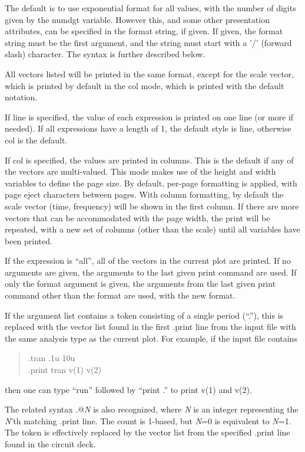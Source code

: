 The default is to use exponential format for all values, with the
number of digits given by the {\et numdgt} variable.  However this,
and some other presentation attributes, can be specified in the format
string, if given.  If given, the format string must be the first
argument, and the string must start with a '/' (forward slash)
character.  The syntax is further described below.

All vectors listed will be printed in the same format, except for the
scale vector, which is printed by default in the {\vt col} mode, which
is printed with the default notation.

If {\vt line} is specified, the value of each expression is printed on
one line (or more if needed).  If all expressions have a length of 1,
the default style is {\vt line}, otherwise {\vt col} is the default.

If {\vt col} is specified, the values are printed in columns.  This is
the default if any of the vectors are multi-valued.  This mode makes
use of the {\vt height} and {\vt width} variables to define the page
size.  By default, per-page formatting is applied, with page eject
characters between pages.  With column formatting, by default the
scale vector ({\et time}, {\et frequency}) will be shown in the first
column.  If there are more vectors that can be accommodated with the
page width, the print will be repeated, with a new set of columns
(other than the scale) until all variables have been printed.

If the expression is ``{\vt all}'', all of the vectors in the current
plot are printed.  If no arguments are given, the arguments to the
last given {\cb print} command are used.  If only the format argument
is given, the arguments from the last given {\cb print} command other
than the format are used, with the new format.

If the argument list contains a token consisting of a single period
(``.''), this is replaced with the vector list found in the first {\vt
.print} line from the input file with the same analysis type as the
current plot.  For example, if the input file contains
\begin{quote}\vt
    .tran .1u 10u\\
    .print tran v(1) v(2)\\
\end{quote}
then one can type ``{\vt run}'' followed by ``{\vt print .}'' to print
{\vt v(1)} and {\vt v(2)}.

The related syntax {\vt .@}{\it N} is also recognized, where {\it N}
is an integer representing the {\it N\/}'th matching {\vt .print} line. 
The count is 1-based, but {\it N\/}=0 is equivalent to {\it N\/}=1. 
The token is effectively replaced by the vector list from the
specified {\vt .print} line found in the circuit deck.


